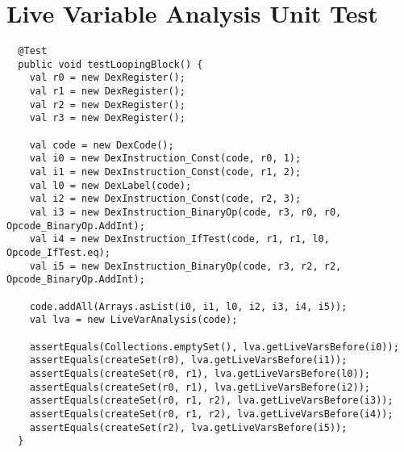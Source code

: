 \section{Live Variable Analysis Unit Test}

\begin{lstlisting}
  @Test
  public void testLoopingBlock() {
    val r0 = new DexRegister();
    val r1 = new DexRegister();
    val r2 = new DexRegister();
    val r3 = new DexRegister();

    val code = new DexCode();
    val i0 = new DexInstruction_Const(code, r0, 1);
    val i1 = new DexInstruction_Const(code, r1, 2);
    val l0 = new DexLabel(code);
    val i2 = new DexInstruction_Const(code, r2, 3);
    val i3 = new DexInstruction_BinaryOp(code, r3, r0, r0, Opcode_BinaryOp.AddInt);
    val i4 = new DexInstruction_IfTest(code, r1, r1, l0, Opcode_IfTest.eq);
    val i5 = new DexInstruction_BinaryOp(code, r3, r2, r2, Opcode_BinaryOp.AddInt);
    
    code.addAll(Arrays.asList(i0, i1, l0, i2, i3, i4, i5));
    val lva = new LiveVarAnalysis(code);

    assertEquals(Collections.emptySet(), lva.getLiveVarsBefore(i0));
    assertEquals(createSet(r0), lva.getLiveVarsBefore(i1));
    assertEquals(createSet(r0, r1), lva.getLiveVarsBefore(l0));
    assertEquals(createSet(r0, r1), lva.getLiveVarsBefore(i2));
    assertEquals(createSet(r0, r1, r2), lva.getLiveVarsBefore(i3));
    assertEquals(createSet(r0, r1, r2), lva.getLiveVarsBefore(i4));
    assertEquals(createSet(r2), lva.getLiveVarsBefore(i5));
  }
\end{lstlisting}
